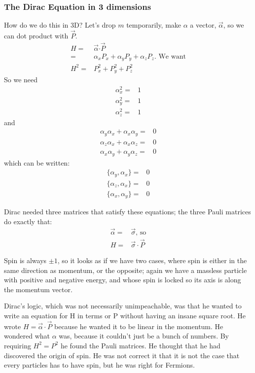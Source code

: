\documentclass[]{article}
\begin{document}
\subsubsection{The Dirac Equation in 3 dimensions}

 How do we do this in 3D? Let's  drop $m$ temporarily, make $\alpha$ a vector, $\vec{\alpha}$, so we can dot product with $\vec{P}$.
\begin{align*}
	H =& \vec{\alpha} \boldsymbol{\cdot} \vec{P}\\
	=& \alpha_x P_x + \alpha_y P_y + \alpha_z P_z \text{. We want}\\
	H^2 =& P_x^2 + P_y^2 + P_z^2
\end{align*}
So we need
\begin{align*}
	\alpha_x^2 =&1\\
	\alpha_y^2 =&1\\
	\alpha_z^2 =&1
\end{align*}
and
\begin{align*}
	\alpha_y\alpha_x + \alpha_x\alpha_y=&0\\
	\alpha_z\alpha_x + \alpha_x\alpha_z=&0\\
	\alpha_x\alpha_y + \alpha_y\alpha_z=&0
\end{align*}
which can be written:
\begin{align*}
	\{\alpha_y,\alpha_x\} =&0\\
	\{\alpha_z,\alpha_x\} =&0\\
	\{\alpha_x,\alpha_y\} =&0
\end{align*}

Dirac needed three matrices that satisfy these equations; the three Pauli matrices do exactly that:
\begin{align*}
	\vec{\alpha}=&\vec{\sigma} \text{, so}\\
	H =& \vec{\sigma} \cdot \vec{P}
\end{align*}

Spin is always $\pm 1$, so it looks as if we have two cases, where spin is either in the same direction as momentum, or the opposite; again we have a massless particle with positive and negative energy, and whose spin is locked so its axis is along the momentum vector.

Dirac's logic, which was not necessarily unimpeachable, was that he wanted to write an equation for H in terms or P without having an insane square root. He wrote $	H = \vec{\alpha} \cdot \vec{P}$ because he wanted it to be linear in the momentum. He wondered what $\alpha$ was, because it couldn't just be a bunch of numbers. By requiring $H^2=P^2$ he found the Pauli matrices. He thought that he had discovered the origin of spin. He was not correct it that it is not the case that every particles has to have spin, but he was right for Fermions.
\end{document}
